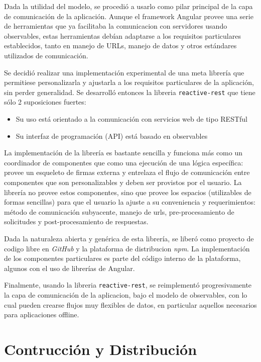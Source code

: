 Dada la utilidad del modelo, se procedió a usarlo como pilar principal de la capa de comunicación de la aplicación. Aunque el framework Angular provee una serie de herramientas que ya facilitaba la comunicacion con servidores usando observables, estas herramientas debían adaptarse a los requisitos particulares establecidos, tanto en manejo de URLs, manejo de datos y otros estándares utilizados de comunicación.

Se decidió realizar una implementación experimental de una meta librería que permitiese personalizarla y ajustarla a los requisitos particulares de la aplicación, sin perder generalidad. Se desarrolló entonces la libreria \texttt{reactive-rest} que tiene sólo 2 suposiciones fuertes:

\begin{itemize}
  \item Su uso está orientado a la comunicación con servicios web de tipo RESTful
  \item Su interfaz de programación (API) está basado en observables
\end{itemize}

La implementación de la librería es bastante sencilla y funciona más como un coordinador de componentes que como una ejecución de una lógica específica: provee un esqueleto de firmas externa y entrelaza el flujo de comunicación entre componentes que son personalizables y deben ser provistos por el usuario. La librería no provee estos componentes, sino que provee los espacios (utilizables de formas sencillas) para que el usuario la ajuste a su conveniencia y requerimientos: método de comunicación subyacente, manejo de urls, pre-procesamiento de solicitudes y post-procesamiento de respuestas.

Dada la naturaleza abierta y genérica de esta librería, se liberó como proyecto de codigo libre en \textit{GitHub} y la plataforma de distribucion \textit{npm}. La implementación de los componentes particulares es parte del código interno de la plataforma, algunos con el uso de librerías de Angular.

Finalmente, usando la libreria \texttt{reactive-rest}, se reimplementó progresivamente la capa de comunicación de la aplicacion, bajo el modelo de observables, con lo cual pueden crearse flujos muy flexibles de datos, en particular aquellos necesarios para aplicaciones offline.

\section{Contrucción y Distribución}

